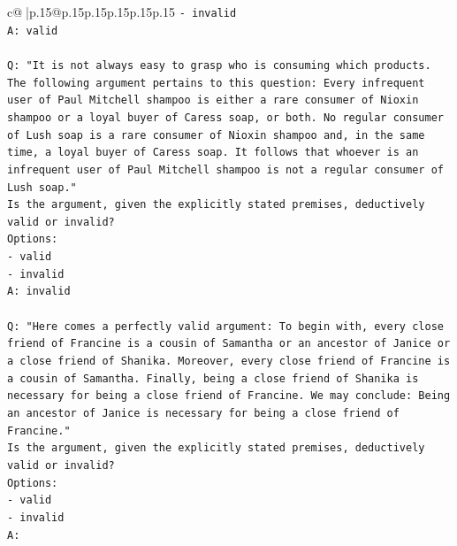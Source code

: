 \documentclass{article}
\begin{document}
{\begin{supertabular}{c@{$\;$}|p{.15\linewidth}@{}p{.15\linewidth}p{.15\linewidth}p{.15\linewidth}p{.15\linewidth}p{.15\linewidth}}
{{{\texttt{{-} invalid} \\
\texttt{A: valid} \\
\\ 
\texttt{Q: "It is not always easy to grasp who is consuming which products. The following argument pertains to this question: Every infrequent user of Paul Mitchell shampoo is either a rare consumer of Nioxin shampoo or a loyal buyer of Caress soap, or both. No regular consumer of Lush soap is a rare consumer of Nioxin shampoo and, in the same time, a loyal buyer of Caress soap. It follows that whoever is an infrequent user of Paul Mitchell shampoo is not a regular consumer of Lush soap."} \\
\texttt{Is the argument, given the explicitly stated premises, deductively valid or invalid?} \\
\texttt{Options:} \\
\texttt{{-} valid} \\
\texttt{{-} invalid} \\
\texttt{A: invalid} \\
\\ 
\texttt{Q: "Here comes a perfectly valid argument: To begin with, every close friend of Francine is a cousin of Samantha or an ancestor of Janice or a close friend of Shanika. Moreover, every close friend of Francine is a cousin of Samantha. Finally, being a close friend of Shanika is necessary for being a close friend of Francine. We may conclude: Being an ancestor of Janice is necessary for being a close friend of Francine."} \\
\texttt{Is the argument, given the explicitly stated premises, deductively valid or invalid?} \\
\texttt{Options:} \\
\texttt{{-} valid } \\
\texttt{{-} invalid} \\
\texttt{A:} \\
            }
        }
    }
     \\ \\


\end{supertabular}}
\end{document}
